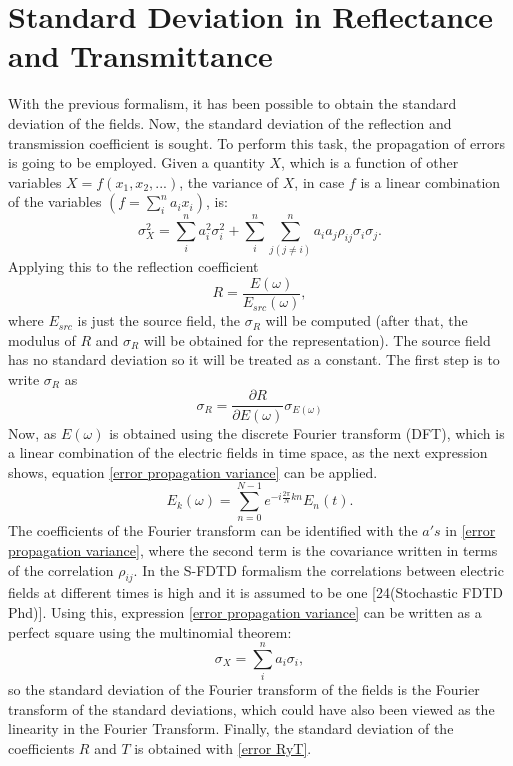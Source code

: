 \documentclass[12pt, oneside]{book}
\begin{document}
\section{Standard Deviation in Reflectance and Transmittance}
With the previous formalism, it has been possible to obtain the standard deviation of the fields. Now, the standard deviation of the reflection and transmission coefficient is sought. To perform this task, the propagation of errors is going to be employed. Given a quantity $X$, which is a function of other variables $X=f(x_1,x_2,...)$, the variance of $X$, in case $f$ is a linear combination of the variables $\left( f= \sum_i^n a_i x_i \right)$, is:
\begin{equation}\label{error propagation variance}
\sigma_X ^2 = \sum_i ^n a_i^2 \sigma_i^2 + \sum_i^n \sum_{j(j\neq i)} ^n a_i a_j \rho_{ij} \sigma_i \sigma_j .
\end{equation}
Applying this to the reflection coefficient 
\begin{equation}
R=\frac{E(\omega)}{E_{src}(\omega)} ,
\end{equation}
where $E_{src}$ is just the source field, the $\sigma_R$ will be computed (after that, the modulus of $R$ and $\sigma_R$ will be obtained for the representation). The source field has no standard deviation so it will be treated as a constant. The first step is to write $\sigma_R$ as
\begin{equation} \label{error RyT}
\sigma_R= \frac{\partial R}{\partial E(\omega)} \sigma_{E(\omega)}
\end{equation} 
Now, as $E(\omega)$ is obtained using the discrete Fourier transform (DFT), which is a linear combination of the electric fields in time space, as the next expression shows, equation \ref{error propagation variance} can be applied.
\begin{equation}
E_k(\omega)=\sum_{n=0}^{N-1} e^{-i\frac{2\pi}{N} k n} E_n(t).
\end{equation} 
The coefficients of the Fourier transform can be identified with the $a's$ in \ref{error propagation variance}, where the second term is the covariance written in terms of the correlation $\rho_{ij}$. In the S-FDTD formalism the correlations between electric fields at different times is high and it is assumed to be one [24(Stochastic FDTD Phd)]. Using this, expression \ref{error propagation variance} can be written as a perfect square using the multinomial theorem:
\begin{equation}
\sigma_X=\sum_i ^n a_i \sigma_i,
\end{equation}
so the standard deviation of the Fourier transform of the fields is the Fourier transform of the standard deviations, which could have also been viewed as the linearity in the Fourier Transform.
Finally, the standard deviation of the coefficients $R$ and $T$ is obtained with \ref{error RyT}.
\end{document}
